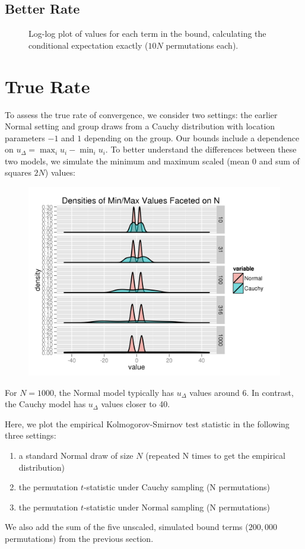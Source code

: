 \subsection{Better Rate}
\begin{figure}[!ht]
  \centering
  
  \caption{Log-log plot of values for each term in the bound, calculating the conditional
    expectation exactly ($10N$ permutations each).}
\end{figure}

\section{True Rate}
To assess the true rate of convergence, we consider two settings: the
earlier Normal setting and group draws from a Cauchy distribution with
location parameters $-1$ and $1$ depending on the group.  Our bounds
include a dependence on $u_{\Delta} = \max_i u_{i} - \min_i u_{i}$.
To better understand the differences between these two models, we
simulate the minimum and maximum scaled (mean $0$ and sum of squares
$2N$) values:
\begin{figure}[!ht]
  \centering
  \includegraphics{./simulations/sim5.png}
\end{figure}

For $N=1000$, the Normal model typically has $u_{\Delta}$ values
around 6.  In contrast, the Cauchy model has $u_{\Delta}$ values
closer to 40.
\clearpage

Here, we plot the empirical Kolmogorov-Smirnov test statistic in the following three settings:
\begin{enumerate}
\item a standard Normal draw of size $N$ (repeated N times to get the empirical distribution)
\item the permutation $t$-statistic under Cauchy sampling (N permutations)
\item the permutation $t$-statistic under Normal sampling (N permutations)
\end{enumerate}
We also add the sum of the five unscaled, simulated bound terms ($200,000$ permutations) from the
previous section.

